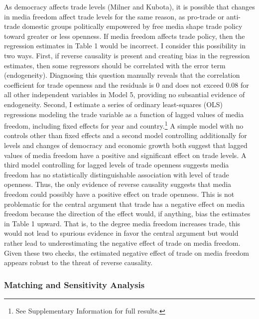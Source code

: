 \documentclass[12pt,a4paper]{article}\usepackage[]{graphicx}\usepackage[]{color}
\begin{document}
As democracy affects trade levels (Milner and Kubota), it is possible that changes in media freedom affect trade levels for the same reason, as pro-trade or anti-trade domestic groups politically empowered by free media shape trade policy toward greater or less openness. If media freedom affects trade policy, then the regression estimates in Table 1 would be incorrect. I consider this possibility in two ways. First, if reverse causality is present and creating bias in the regression estimates, then some regressors should be correlated with the error term (endogeneity). Diagnosing this question manually reveals that the correlation coefficient for trade openness and the residuals is 0 and does not exceed 0.08 for all other independent variables in Model 5, providing no subsantial evidence of endogeneity. Second, I estimate a series of ordinary least-squares (OLS) regressions modeling the trade variable as a function of lagged values of media freedom, including fixed effects for year and country.\footnote{See Supplementary Information for full results.} A simple model with no controls other than fixed effects and a second model controlling additionally for levels and changes of democracy and economic growth both suggest that lagged values of media freedom have a positive and significant effect on trade levels. A third model controlling for lagged levels of trade openness suggests media freedom has no statistically distinguishable association with level of trade openness. Thus, the only evidence of reverse causality suggests that media freedom could possibly have a positive effect on trade openness. This is not problematic for the central argument that trade has a negative effect on media freedom because the direction of the effect would, if anything, bias the estimates in Table 1 upward. That is, to the degree media freedom increases trade, this would not lead to spurious evidence in favor the central argument but would rather lead to underestimating the negative effect of trade on media freedom. Given these two checks, the estimated negative effect of trade on media freedom appears robust to the threat of reverse causality.

\subsubsection{Matching and Sensitivity Analysis}
\end{document}
